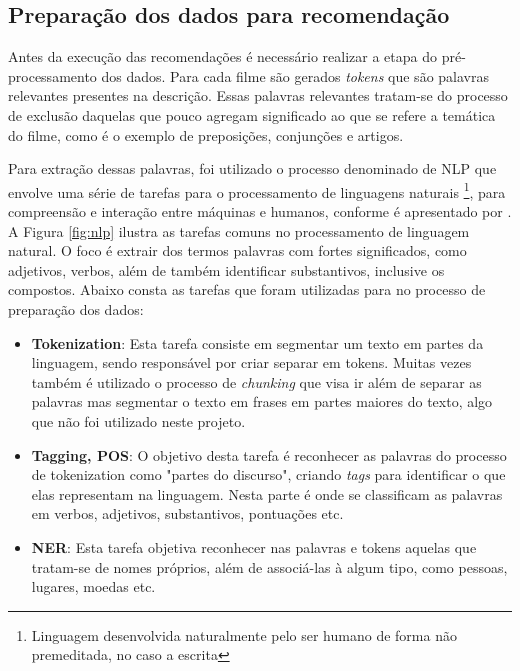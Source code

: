 \subsection{Preparação dos dados para recomendação}
\label{ssec:data_nlp}

Antes da execução das recomendações é necessário realizar a etapa do pré-processamento dos dados. Para cada filme são gerados \textit{tokens} que são palavras relevantes presentes na descrição. Essas palavras relevantes tratam-se do processo de exclusão daquelas que pouco agregam significado ao que se refere a temática do filme, como é o exemplo de preposições, conjunções e artigos.

Para extração dessas palavras, foi utilizado o processo denominado de \ac{NLP} que envolve uma série de tarefas para o processamento de linguagens naturais \footnote{Linguagem desenvolvida naturalmente pelo ser humano de forma não premeditada, no caso a escrita}, para compreensão e interação entre máquinas e humanos, conforme é apresentado por \cite{Collobert:2011}. A Figura \ref{fig:nlp} ilustra as tarefas comuns no processamento de linguagem natural. O foco é extrair dos termos palavras com fortes significados, como adjetivos, verbos, além de também identificar substantivos, inclusive os compostos. Abaixo consta as tarefas que foram utilizadas para no processo de preparação dos dados:

\begin{itemize}
	\item{\textbf{Tokenization}: Esta tarefa consiste em segmentar um texto em partes da linguagem, sendo responsável por criar separar em tokens. Muitas vezes também é utilizado o processo de \textit{chunking} que visa ir além de separar as palavras mas segmentar o texto em frases em partes maiores do texto, algo que não foi utilizado neste projeto.}
	\item{\textbf{Tagging, \ac{POS}}: O objetivo desta tarefa é reconhecer as palavras do processo de tokenization como "partes do discurso", criando \textit{tags} para identificar o que elas representam na linguagem. Nesta parte é onde se classificam as palavras em verbos, adjetivos, substantivos, pontuações etc.}
	\item{\textbf{\ac{NER}}: Esta tarefa objetiva reconhecer nas palavras e tokens aquelas que tratam-se de nomes próprios, além de associá-las à algum tipo, como pessoas, lugares, moedas etc.}
\end{itemize}

